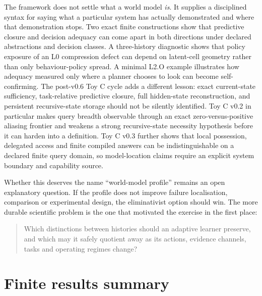 \documentclass[10pt]{article}
\begin{document}
The framework does not settle what a world model \emph{is}. It supplies a disciplined syntax for saying what a particular system has actually demonstrated and where that demonstration stops. Two exact finite constructions show that predictive closure and decision adequacy can come apart in both directions under declared abstractions and decision classes. A three-history diagnostic shows that policy exposure of an L0 compression defect can depend on latent-cell geometry rather than only behaviour-policy spread. A minimal L2.O example illustrates how adequacy measured only where a planner chooses to look can become self-confirming. The post-v0.6 Toy C cycle adds a different lesson: exact current-state sufficiency, task-relative predictive closure, full hidden-state reconstruction, and persistent recursive-state storage should not be silently identified. Toy C v0.2 in particular makes query breadth observable through an exact zero-versus-positive aliasing frontier and weakens a strong recursive-state necessity hypothesis before it can harden into a definition. Toy C v0.3 further shows that local possession, delegated access and finite compiled answers can be indistinguishable on a declared finite query domain, so model-location claims require an explicit system boundary and capability source.

Whether this deserves the name ``world-model profile'' remains an open explanatory question. If the profile does not improve failure localisation, comparison or experimental design, the eliminativist option should win. The more durable scientific problem is the one that motivated the exercise in the first place:
\begin{quote}
Which distinctions between histories should an adaptive learner preserve, and which may it safely quotient away as its actions, evidence channels, tasks and operating regimes change?
\end{quote}

\clearpage
\appendix
\section{Finite results summary}
\end{document}
